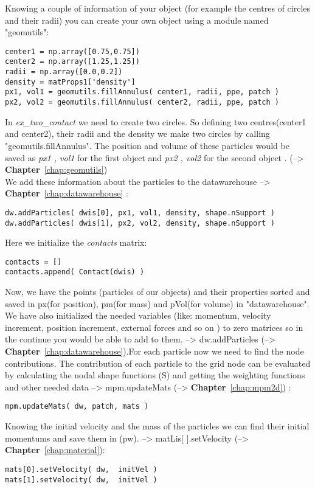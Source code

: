 \documentclass[11pt,fleqn]{book} %
\begin{document}
Knowing a couple of information of your object (for example the centres of circles and their radii) you can create your own object using a module named "geomutils":
\begin{lstlisting}
center1 = np.array([0.75,0.75])
center2 = np.array([1.25,1.25])
radii = np.array([0.0,0.2])
density = matProps1['density']
px1, vol1 = geomutils.fillAnnulus( center1, radii, ppe, patch )
px2, vol2 = geomutils.fillAnnulus( center2, radii, ppe, patch )
\end{lstlisting}

In \emph{ex\_two\_contact} we need to create two circles. So defining two centres(center1 and center2), their radii and the density we make two circles by calling "geomutils.fillAnnulus". The position and volume of these particles would be saved as \emph{px1 , vol1} for the first object and \emph{px2 , vol2} for the second object . (--> \textbf{Chapter}~\ref{chap:geomutils})\\
We add these information about the particles to the datawarehouse --> \textbf{Chapter}~\ref{chap:datawarehouse} :
\begin{lstlisting}
dw.addParticles( dwis[0], px1, vol1, density, shape.nSupport )
dw.addParticles( dwis[1], px2, vol2, density, shape.nSupport )
\end{lstlisting}


Here we initialize the \emph{contacts} matrix:
\begin{lstlisting}
contacts = []
contacts.append( Contact(dwis) )
\end{lstlisting}

Now, we have the points (particles of our objects) and their properties sorted and saved in px(for position), pm(for mass) and pVol(for volume) in "datawarehouse". We have also initialized the needed variables (like: momentum, velocity increment, position increment, external forces and so on ) to zero matrices so in the continue you would be able to add to them. --> dw.addParticles (--> \textbf{Chapter}~\ref{chap:datawarehouse}).For each particle now we need to find the node contributions. The contribution of each particle to the grid node can be evaluated by calculating the nodal shape functions (S) and getting the weighting functions and other needed data --> mpm.updateMats (--> \textbf{Chapter}~\ref{chap:mpm2d}) :
\begin{lstlisting}
mpm.updateMats( dw, patch, mats )
\end{lstlisting}

Knowing the initial velocity and the mass of the particles we can find their initial momentums and save them in (pw). --> matLis[ ].setVelocity (--> \textbf{Chapter}~\ref{chap:material}):
\begin{lstlisting}
mats[0].setVelocity( dw,  initVel )
mats[1].setVelocity( dw,  initVel )
\end{lstlisting}
\end{document}
